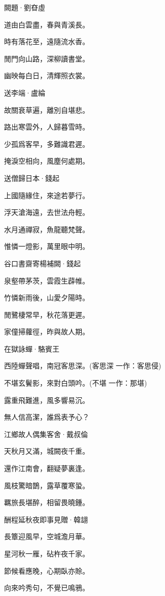 \documentclass[12pt,a4paper]{ctexbook}
\begin{document}
闕題·劉昚虛\par
道由白雲盡，春與青溪長。\par
時有落花至，遠隨流水香。\par
閒門向山路，深柳讀書堂。\par
幽映每白日，清輝照衣裳。\par
送李端·盧綸\par
故關衰草遍，離別自堪悲。\par
路出寒雲外，人歸暮雪時。\par
少孤爲客早，多難識君遲。\par
掩淚空相向，風塵何處期。\par
送僧歸日本·錢起\par
上國隨緣住，來途若夢行。\par
浮天滄海遠，去世法舟輕。\par
水月通禪寂，魚龍聽梵聲。\par
惟憐一燈影，萬里眼中明。\par
谷口書齋寄楊補闕·錢起\par
泉壑帶茅茨，雲霞生薜帷。\par
竹憐新雨後，山愛夕陽時。\par
閒鷺棲常早，秋花落更遲。\par
家僮掃蘿徑，昨與故人期。\par
在獄詠蟬·駱賓王\par
西陸蟬聲唱，南冠客思深。(客思深 一作：客思侵)\par
不堪玄鬢影，來對白頭吟。(不堪 一作：那堪)\par
露重飛難進，風多響易沉。\par
無人信高潔，誰爲表予心？\par
江鄉故人偶集客舍·戴叔倫\par
天秋月又滿，城闕夜千重。\par
還作江南會，翻疑夢裏逢。\par
風枝驚暗鵲，露草覆寒蛩。\par
羈旅長堪醉，相留畏曉鍾。\par
酬程延秋夜即事見贈·韓翃\par
長簟迎風早，空城澹月華。\par
星河秋一雁，砧杵夜千家。\par
節候看應晚，心期臥亦賒。\par
向來吟秀句，不覺已鳴鴉。\par
\end{document}
